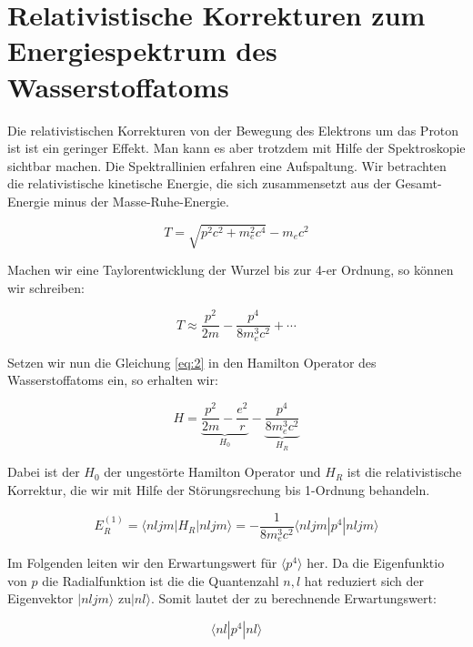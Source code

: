 
\usepackage{amsmath}




\section*{Relativistische Korrekturen zum Energiespektrum des Wasserstoffatoms}


Die relativistischen Korrekturen von der Bewegung des Elektrons um das Proton ist ist ein geringer Effekt. Man kann es aber trotzdem mit Hilfe der Spektroskopie sichtbar machen. Die Spektrallinien erfahren eine Aufspaltung. Wir betrachten die relativistische kinetische Energie, die sich zusammensetzt aus der Gesamt-Energie minus der Masse-Ruhe-Energie.


\begin{equation}
  \label{eq:1}
  T = \sqrt{p^2c^2+m_e^2c^4}-m_ec^2
\end{equation}

Machen wir eine Taylorentwicklung der Wurzel bis zur 4-er Ordnung, so können wir schreiben:

\begin{equation}
  \label{eq:2}
  T \approx \frac{p^2}{2m}-\frac{p^4}{8m_e^3c^2}+\cdots
\end{equation}


Setzen wir nun die Gleichung \eqref{eq:2} in den Hamilton Operator des Wasserstoffatoms ein, so erhalten wir:


\begin{equation}
  \label{eq:3}
  H = \underbrace{\frac{p^2}{2m}-\frac{e^2}{r}}_{H_0}-\underbrace{\frac{p^4}{8m_e^3c^2}}_{H_R}
\end{equation}


Dabei ist der \(H_0\) der ungestörte Hamilton Operator und \(H_R\) ist die relativistische Korrektur, die wir mit Hilfe der Störungsrechung bis 1-Ordnung behandeln.

\begin{equation}
  \label{eq:4}
  E^{(1)}_R = \langle nljm|H_R|nljm\rangle  = - \frac{1}{8m_e^3c^2}\langle nljm|p^4|nljm\rangle
\end{equation}

Im Folgenden leiten wir den Erwartungswert für \(\langle p^4 \rangle \) her. Da die Eigenfunktio von \(p\) die Radialfunktion ist die die Quantenzahl \(n,l\) hat reduziert sich der Eigenvektor  \(|nljm\rangle \)  zu\(|nl\rangle \). Somit lautet der zu berechnende Erwartungswert:

\begin{equation}
  \label{eq:5}
  \langle nl|p^4|nl\rangle
\end{equation}

